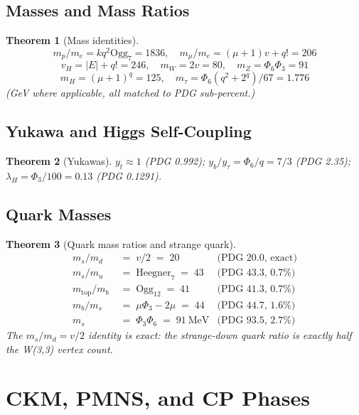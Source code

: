 \documentclass[11pt]{article}
\newtheorem{theorem}{Theorem}[section]
\begin{document}
\subsection{Masses and Mass Ratios}

\begin{theorem}[Mass identities]\label{thm:masses}
\[ m_p/m_e = k q^2 \mathrm{Ogg}_7 = 1836, \quad m_\mu/m_e = (\mu+1)v + q! = 206 \]
\[ v_H = |E| + q! = 246, \quad m_W = 2v = 80, \quad m_Z = \Phi_6\Phi_3 = 91 \]
\[ m_H = (\mu+1)^q = 125, \quad m_\tau = \Phi_6(q^2+2^q)/67 = 1.776 \]
(GeV where applicable, all matched to PDG sub-percent.)
\end{theorem}

\subsection{Yukawa and Higgs Self-Coupling}

\begin{theorem}[Yukawas]\label{thm:yukawa}
$y_t \approx 1$ (PDG 0.992); $y_b/y_\tau = \Phi_6/q = 7/3$ (PDG 2.35);
$\lambda_H = \Phi_3/100 = 0.13$ (PDG 0.1291).
\end{theorem}

\subsection{Quark Masses}

\begin{theorem}[Quark mass ratios and strange quark]\label{thm:quark_masses}
\begin{align*}
  m_s / m_d   &\;=\; v / 2 \;=\; 20 & \text{(PDG 20.0, exact)} \\
  m_s / m_u   &\;=\; \mathrm{Heegner}_7 \;=\; 43 & \text{(PDG 43.3, 0.7\%)} \\
  m_{\mathrm{top}} / m_b &\;=\; \mathrm{Ogg}_{12} \;=\; 41 & \text{(PDG 41.3, 0.7\%)} \\
  m_b / m_s   &\;=\; \mu \Phi_3 - 2\mu \;=\; 44 & \text{(PDG 44.7, 1.6\%)} \\
  m_s         &\;=\; \Phi_3 \Phi_6 \;=\; 91~\mathrm{MeV} & \text{(PDG 93.5, 2.7\%)}
\end{align*}
The $m_s/m_d = v/2$ identity is exact: the strange-down quark ratio
is exactly half the W(3,3) vertex count.
\end{theorem}

\section{CKM, PMNS, and CP Phases}
\end{document}
